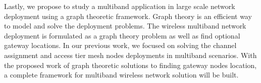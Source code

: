 Lastly, we propose to study a multiband application in large scale network deployment 
using a graph theoretic framework. Graph theory is an efficient way to model and solve 
the deployment problems. The wireless multiband network deployment is formulated as a 
graph theory problem as well as find optional gateway locations. In our previous work,
we focused on solving the channel assignment and access tier mesh nodes deployments
in multiband scenarios. With the proposed work of graph theoretic solutions to finding 
gateway nodes location, a complete framework for multiband wireless network solution 
will be built. 

